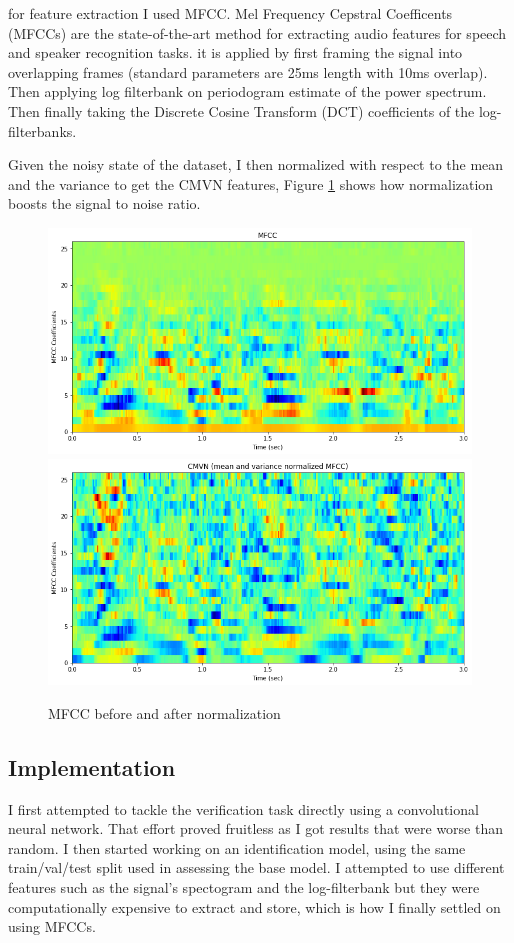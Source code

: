 \documentclass{article}
\begin{document}
for feature extraction I used MFCC. Mel Frequency Cepstral Coefficents (MFCCs) are the state-of-the-art method for extracting audio features for speech and speaker recognition tasks. it is applied by first framing the signal into overlapping frames (standard parameters are 25ms length with 10ms overlap). Then applying log filterbank on periodogram estimate of the power spectrum. Then finally taking the Discrete Cosine Transform (DCT) coefficients of the log-filterbanks.\cite{jlyon}

Given the noisy state of the dataset, I then normalized with respect to the mean and the variance to get the CMVN features, Figure \ref{fig:normalizatin} shows how normalization boosts the signal to noise ratio.

\begin{figure}[H]
    \includegraphics[scale=.5]{images/mfcc.png}
    \includegraphics[scale=.5]{images/cmvn.png}
    \caption{MFCC before and after normalization}
    \label{fig:normalizatin}
\end{figure}

\subsection{Implementation} \label{implementation}
I first attempted to tackle the verification task directly using a convolutional neural network. That effort proved fruitless as I got results that were worse than random. I then started working on an identification model, using the same train/val/test split used in assessing the base model. I attempted to use different features such as the signal's spectogram and the log-filterbank but they were computationally expensive to extract and store, which is how I finally settled on using MFCCs.
\end{document}

